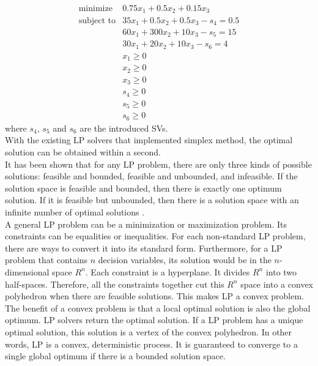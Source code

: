 \begin{eqnarray} 
\text{minimize} & 0.75x_{1} + 0.5x_{2} +  0.15x_{3}  \nonumber \\
\text{subject to} & 35x_{1} + 0.5x_{2} + 0.5x_{3} - s_{4} = 0.5 \nonumber \\
& 60x_{1} + 300x_{2} + 10x_{3} - s_{5} = 15 \nonumber \\
& 30x_{1} + 20x_{2} + 10x_{3} - s_{6} = 4 \nonumber \\
& x_{1} \geq 0  \nonumber \\
& x_{2} \geq 0  \nonumber \\
& x_{3} \geq 0  \nonumber \\
& s_{4} \geq 0  \nonumber \\
& s_{5} \geq 0  \nonumber \\
& s_{6} \geq 0  \label{eq:1.15} 
\end{eqnarray} 
where $s_{4}$, $s_{5}$ and $s_{6}$ are the introduced SVs.  \\

With the existing LP solvers that implemented simplex method, the optimal solution can be obtained within a second. \\

It has been shown that for any LP problem, there are only three kinds of possible solutions: feasible and bounded, feasible and unbounded, and infeasible. If the solution space is feasible and bounded, then there is exactly one optimum solution. If it is feasible but unbounded, then there is a solution space with an infinite number of optimal solutions \cite{LP}. \\

A general LP problem can be a minimization or maximization problem. Its constraints can be equalities or inequalities. For each non-standard LP problem, there are ways to convert it into its standard form. Furthermore, for a LP problem that contains $n$ decision variables, its solution would be in the $n$-dimensional space $R^{n}$. Each constraint is a hyperplane. It divides $R^{n}$ into two half-spaces. Therefore, all the constraints together cut this $R^{n}$ space into a convex polyhedron when there are feasible solutions. This makes LP a convex problem. The benefit of a convex problem is that a local optimal solution is also the global optimum. LP solvers return the optimal solution. If a LP problem has a unique optimal solution, this solution is a vertex of the convex polyhedron. In other words, LP is a convex, deterministic process. It is guaranteed to converge to a single global optimum if there is a bounded solution space. \\

